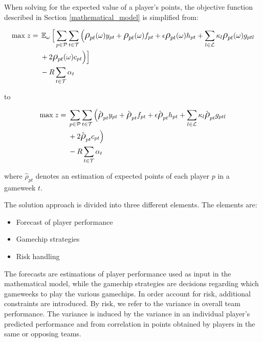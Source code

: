 When solving for the expected value of a player's points, the objective function described in Section \ref{mathematical_model} is simplified from: 

\begin{equation*}
\smaller
\begin{aligned}
\text{max} \; z ={} & \EX_{\omega} \Big\lbrack\sum\limits_{p \in \mathcal{P}} \sum\limits_{t \in \mathcal{T}} \Big( \mathlarger{\rho}_{pt}(\omega)y_{pt} + \mathlarger{\rho}_{pt}(\omega)f_{pt} + \epsilon  \mathlarger{\rho}_{pt}(\omega)h_{pt} + \sum_{l \in \mathcal{L}}\kappa_{l} \mathlarger{\rho}_{pt}(\omega)g_{ptl} \\ 
&  + 2 \mathlarger{\rho}_{pt}(\omega)c_{pt} \Big)  \Big\rbrack \\ 
& - R\sum_{t \in \mathcal{T}}\alpha_{t}
\end{aligned}
\end{equation*}

to 

\begin{equation*}
\smaller
\begin{aligned}
\text{max} \; z ={} &  \sum\limits_{p \in \mathcal{P}} \sum\limits_{t \in \mathcal{T}} \Big( \hat{\mathlarger{\rho}}_{pt} y_{pt} + \hat{\mathlarger{\rho}}_{pt} f_{pt} + \epsilon  \hat{\mathlarger{\rho}}_{pt} h_{pt} + \sum_{l \in \mathcal{L}}\kappa_{l} \hat{\mathlarger{\rho}}_{pt} g_{ptl} \\ 
& + 2 \hat{\mathlarger{\rho}}_{pt} c_{pt} \Big)  \\ 
& - R\sum_{t \in \mathcal{T}}\alpha_{t}
\end{aligned}
\end{equation*}


where $\hat{\rho}_{pt}$ denotes an estimation of expected points of each player $p$ in a gameweek $t$.

\newpar


The solution approach is divided into three different elements. The elements are:

\begin{itemize}
    \item Forecast of player performance
    \item Gamechip strategies
    \item Risk handling
\end{itemize}

The forecasts are estimations of player performance used as input in the mathematical model, while the gamechip strategies are decisions regarding which gameweeks to play the various gamechips. In order account for risk, additional constraints are introduced. By risk, we refer to the variance in overall team performance. The variance is induced by the variance in an individual player's predicted performance and from correlation in points obtained by players in the same or opposing teams.

